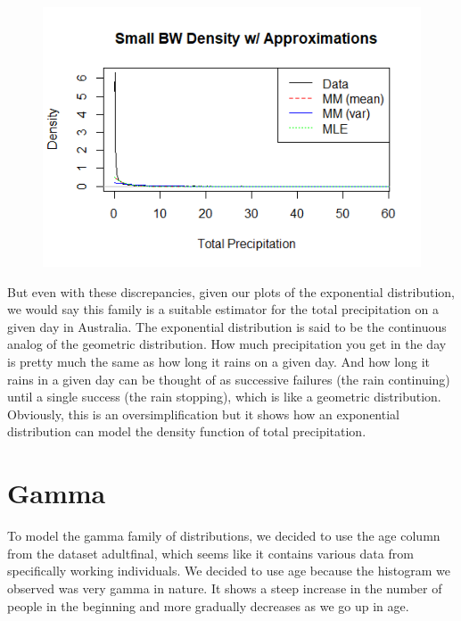 \documentclass[12pt, a4paper, oneside]{report}
\begin{document}
\begin{figure}[h]
  \centering
  \includegraphics[width=0.7 \linewidth]{expDensitySmallA.png} %
\end{figure}


But even with these discrepancies, given our plots of the exponential distribution, we would say this family is a suitable estimator for the total precipitation on a given day in Australia. The exponential distribution is said to be the continuous analog of the geometric distribution. How much precipitation you get in the day is pretty much the same as how long it rains on a given day. And how long it rains in a given day can be thought of as successive failures (the rain continuing) until a single success (the rain stopping), which is like a geometric distribution. Obviously, this is an oversimplification but it shows how an exponential distribution can model the density function of total precipitation.



















\newpage
\section*{Gamma}
To model the gamma family of distributions, we decided to use the age column from the dataset adultfinal, which seems like it contains various data from specifically working individuals. We decided to use age because the histogram we observed was very gamma in nature. It shows a steep increase in the number of people in the beginning and more gradually decreases as we go up in age.
\end{document}
